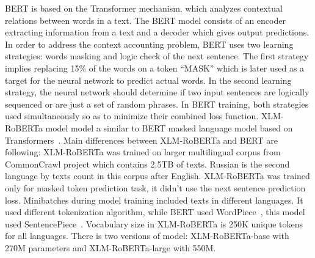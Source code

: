 \documentclass[a4paper,fleqn,longmktitle]{cas-dc}
\begin{document}
BERT is based on the Transformer mechanism, which analyzes contextual relations between words in a text. The BERT model consists of an encoder extracting information from a text and a decoder which gives output predictions. In order to address the context accounting problem, BERT uses two learning strategies: words masking and logic check of the next sentence. The first strategy implies replacing 15\% of the words on a token ``MASK'' which is later used as a target for the neural network to predict actual words. In the second learning strategy, the neural network should determine if two input sentences are logically sequenced or are just a set of random phrases. In BERT training, both strategies used simultaneously so as to minimize their combined loss function.
XLM-RoBERTa model model a similar to BERT masked language model based on Transformers~\cite{vaswani2017attention}. Main differences between XLM-RoBERTa and BERT are following: XLM-RoBERTa was trained on larger multilingual corpus from CommonCrawl project which contains 2.5TB of texts. Russian is the second language by texts count in this corpus after English. XLM-RoBERTa was trained only for masked token prediction task, it didn't use the next sentence prediction loss. Minibatches during model training included texts in different languages. It used different tokenization algorithm, while BERT used WordPiece~\cite{schuster2012japanese}, this model used SentencePiece~\cite{kudo2018sentencepiece}. Vocabulary size in XLM-RoBERTa is 250K unique tokens for all languages. There is two versions of model: XLM-RoBERTa-base with 270M parameters and XLM-RoBERTa-large with 550M.
\end{document}
